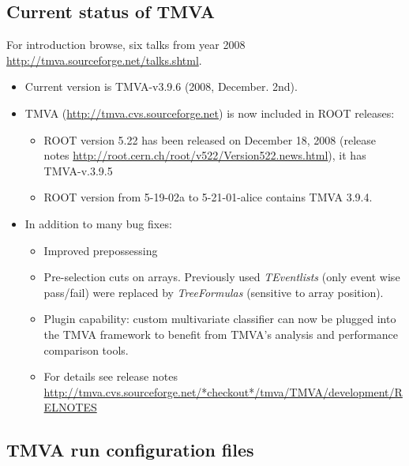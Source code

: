 \begin{appendix}
\subsection{Current status of TMVA}
For introduction browse, six talks from year 2008 \url{http://tmva.sourceforge.net/talks.shtml}.

\begin{itemize}
\item Current version is TMVA-v3.9.6 (2008, December. 2nd).
\item TMVA (\url{http://tmva.cvs.sourceforge.net}) is now included in ROOT releases:
\begin{itemize}
\item ROOT version 5.22 has been released on December 18, 2008
  (release notes \url{http://root.cern.ch/root/v522/Version522.news.html}),
  it has TMVA-v.3.9.5
\item ROOT version from 5-19-02a to 5-21-01-alice contains TMVA 3.9.4.
\end{itemize}

\item In addition to many bug fixes:
\begin{itemize}
\item Improved prepossessing
\item Pre-selection cuts on arrays. Previously used {\em TEventlists} 
(only event  wise pass/fail) were replaced by {\em TreeFormulas} (sensitive to array position).
\item Plugin capability: custom multivariate classifier can now be plugged into
    the TMVA framework to benefit from TMVA's analysis and performance comparison
    tools. 

\item For details see release notes 
\url{http://tmva.cvs.sourceforge.net/*checkout*/tmva/TMVA/development/RELNOTES}
\end{itemize}

\end{itemize}



\subsection{TMVA run configuration files}


\end{appendix}
